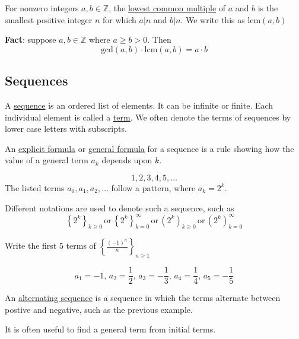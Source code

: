 \begin{definition}
    For nonzero integers $a,b\in\mathbb Z$, the \underline{lowest common multiple} of $a$ and $b$ is the smallest positive integer $n$ for which $a|n$ and $b|n$. We write this as $\text{lcm}\left(a,b\right)$
\end{definition}

\textbf{Fact}: suppose $a,b\in\mathbb{Z}$ where $a\geq b > 0$. Then $$\text{gcd}\left(a,b\right)\cdot\text{lcm}\left(a,b\right) = a\cdot b$$

\subsection{Sequences}
\begin{definition}
    A \underline{sequence} is an ordered list of elements. It can be infinite or finite. Each individual element is called a \underline{term}. We often denote the terms of sequences by lower case letters with subscripts.
\end{definition}

An \underline{explicit formula} or \underline{general formula} for a sequence is a rule showing how the value of a general term $a_k$ depends upon $k$.

\begin{example}
$$1,2,3,4,5,\dots$$
The listed terms $a_0, a_1, a_2, \dots$ follow a pattern, where $a_k = 2^k$.

Different notations are used to denote such a sequence, such as $$\left\{2^k\right\}_{k\geq 0}\,\text{or}\,\left\{2^k\right\}^\infty_{k=0}\,\text{or}\,\left(2^k\right)_{k\geq 0}\,\text{or}\,\left(2^k\right)^\infty_{k=0}$$
\end{example}

\begin{example}
    Write the first 5 terms of $\left\{\frac{\left(-1\right)^n}{n}\right\}_{n\geq 1}$

    $$a_1 = -1,\, a_2 = \frac12,\, a_3 = -\frac13,\, a_4 = \frac14,\, a_5 = -\frac15$$
\end{example}

\begin{definition}
    An \underline{alternating sequence} is a sequence in which the terms alternate between postive and negative, such as the previous example.
\end{definition}

It is often useful to find a general term from initial terms.

